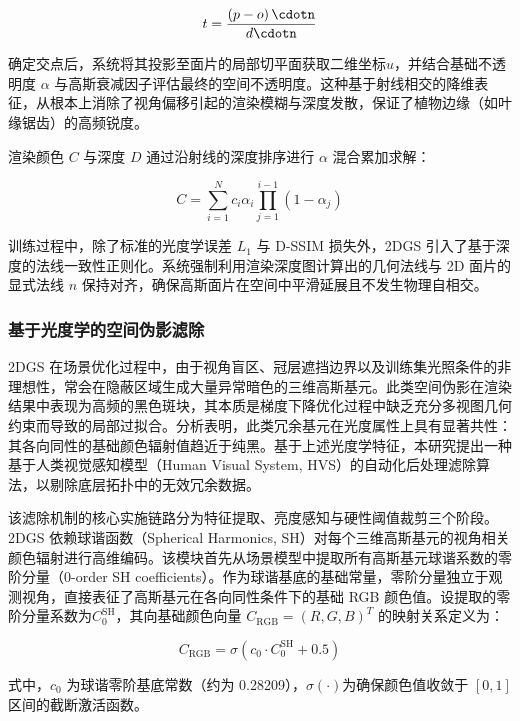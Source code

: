 \documentclass[preprint,12pt]{elsarticle}
\begin{document}
\begin{equation}
t=\frac{\left(p-o\right)\cdotn}{d\cdotn}
\end{equation}

确定交点后，系统将其投影至面片的局部切平面获取二维坐标$u$，并结合基础不透明度 $\alpha$ 与高斯衰减因子评估最终的空间不透明度。这种基于射线相交的降维表征，从根本上消除了视角偏移引起的渲染模糊与深度发散，保证了植物边缘（如叶缘锯齿）的高频锐度。

渲染颜色 $C$ 与深度 $D$ 通过沿射线的深度排序进行 $\alpha$ 混合累加求解：

\begin{equation}
C=\sum_{i=1}^{N} {c}_{i}{\alpha}_{i}\prod_{j=1}^{i-1} \left(1-{\alpha}_{j}\right)
\end{equation}

训练过程中，除了标准的光度学误差 ${L}_{1}$ 与 D-SSIM 损失外，2DGS 引入了基于深度的法线一致性正则化。系统强制利用渲染深度图计算出的几何法线与 2D 面片的显式法线 $n$ 保持对齐，确保高斯面片在空间中平滑延展且不发生物理自相交。

\subsubsection{基于光度学的空间伪影滤除}

2DGS 在场景优化过程中，由于视角盲区、冠层遮挡边界以及训练集光照条件的非理想性，常会在隐蔽区域生成大量异常暗色的三维高斯基元。此类空间伪影在渲染结果中表现为高频的黑色斑块，其本质是梯度下降优化过程中缺乏充分多视图几何约束而导致的局部过拟合。分析表明，此类冗余基元在光度属性上具有显著共性：其各向同性的基础颜色辐射值趋近于纯黑。基于上述光度学特征，本研究提出一种基于人类视觉感知模型（Human Visual System, HVS）的自动化后处理滤除算法，以剔除底层拓扑中的无效冗余数据。

该滤除机制的核心实施链路分为特征提取、亮度感知与硬性阈值裁剪三个阶段。2DGS 依赖球谐函数（Spherical Harmonics, SH）对每个三维高斯基元的视角相关颜色辐射进行高维编码。该模块首先从场景模型中提取所有高斯基元球谐系数的零阶分量（0-order SH coefficients）。作为球谐基底的基础常量，零阶分量独立于观测视角，直接表征了高斯基元在各向同性条件下的基础 RGB 颜色值。设提取的零阶分量系数为${C}_{0}^{\mathrm{SH}}$，其向基础颜色向量 ${C}_{\mathrm{RGB}}={\left(R,G,B\right)}^{T}$ 的映射关系定义为：

\begin{equation}
{C}_{\mathrm{RGB}}=\sigma\left({c}_{0}\cdot{C}_{0}^{\mathrm{SH}}+0.5\right)
\end{equation}

式中，${c}_{0}$ 为球谐零阶基底常数（约为 0.28209），$\sigma\left(\cdot\right)$为确保颜色值收敛于 $\left[0,1\right]$ 区间的截断激活函数。
\end{document}
